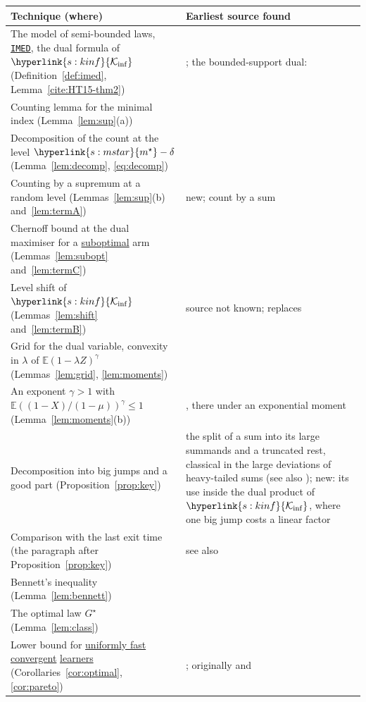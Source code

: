 \documentclass[11pt]{article}
\newcommand{\E}{\mathbb{E}}
\newcommand{\sy}[2]{{\hyperlink{#1}{#2}}}
\newcommand{\term}[2]{\hyperlink{#1}{#2}}
\newcommand{\imed}{\hyperref[alg:imed]{\texttt{IMED}}}
\newcommand{\ms}{\sy{s:mstar}{m^{\star}}}
\newcommand{\Kinf}{\sy{s:kinf}{\mathcal{K}_{\inf}}}
\begin{document}
\begin{center}
\small
\begin{tabular}{@{}p{}p{}@{}}
\toprule
Technique (where) & Earliest source found \\
\midrule
The model of semi-bounded laws, \imed{}, the dual formula of $\Kinf$ (Definition~\ref{def:imed}, Lemma~\ref{cite:HT15-thm2}) & \citet[Algorithm~1, Theorem~2]{HT15}; the bounded-support dual: \citet{HT10} \\
Counting lemma for the minimal index (Lemma~\ref{lem:sup}(a)) & \citet[Lemma~13]{HT15} \\
Decomposition of the count at the level $\ms-\delta$ (Lemma~\ref{lem:decomp}, \eqref{eq:decomp}) & \citet[proof of Theorem~3, (29)]{HT15} \\
Counting by a supremum at a random level (Lemmas~\ref{lem:sup}(b) and~\ref{lem:termA}) & new; \citet[(25)--(26)]{HT15} count by a sum \\
Chernoff bound at the dual maximiser for a \term{w:subopt}{suboptimal} arm (Lemmas~\ref{lem:subopt} and~\ref{lem:termC}) & \citet[Proposition~10 and Lemma~6]{HT15} \\
Level shift of $\Kinf$ (Lemmas~\ref{lem:shift} and~\ref{lem:termB}) & source not known; replaces \citet[Lemma~7]{HT15} \\
Grid for the dual variable, convexity in $\lambda$ of $\E(1-\lambda Z)^\gamma$ (Lemmas~\ref{lem:grid}, \ref{lem:moments}) & \citet[proof of Proposition~11, (19)--(24)]{HT15} \\
An exponent $\gamma>1$ with $\E((1-X)/(1-\mu))^\gamma\le1$ (Lemma~\ref{lem:moments}(b)) & \citet[Proposition~11(i)]{HT15}, there under an exponential moment \\
Decomposition into big jumps and a good part (Proposition~\ref{prop:key}) & the split of a sum into its large summands and a truncated rest, classical in the large deviations of heavy-tailed sums (see also \citealp{FN71,Nag79}); new: its use inside the dual product of $\Kinf$, where one big jump costs a linear factor \\
Comparison with the last exit time (the paragraph after Proposition~\ref{prop:key}) & see also \citet{CL75,Jan86} \\
Bennett's inequality (Lemma~\ref{lem:bennett}) & \citet{B62} \\
The optimal law $G^\star$ (Lemma~\ref{lem:class}) & \citet[proof of Theorem~2(ii)]{HT15} \\
Lower bound for \term{w:ufc}{uniformly fast convergent} \term{w:learner}{learners} (Corollaries~\ref{cor:optimal}, \ref{cor:pareto}) & \citet[Theorem~1]{GMS19}; originally \citet{LR85} and \citet{BK96} \\

\end{tabular}
\end{center}
\end{document}
